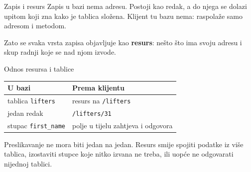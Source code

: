 \begin{frame}{Zapis i resurs}
Zapis u bazi nema adresu. Postoji kao redak, a do njega se dolazi upitom koji zna kako je tablica složena. Klijent tu bazu nema: raspolaže samo adresom i metodom.

\vspace{0.9em}
\begin{center}
\end{center}

\vspace{0.9em}
Zato se svaka vrsta zapisa objavljuje kao \textbf{resurs}: nešto što ima svoju adresu i skup radnji koje se nad njom izvode.
\end{frame}

\begin{frame}{Odnos resursa i tablice}
\vspace{0.4em}
\begin{center}
{\small
\setlength{\tabcolsep}{10pt}
\renewcommand{\arraystretch}{1.3}
\begin{tabular}{@{}ll@{}}
  \toprule
  \textbf{U bazi} & \textbf{Prema klijentu} \\
  \midrule
  tablica \texttt{lifters}    & resurs na \texttt{/lifters} \\
  jedan redak                 & \texttt{/lifters/31} \\
  stupac \texttt{first\_name} & polje u tijelu zahtjeva i odgovora \\
  \bottomrule
\end{tabular}
}
\end{center}

\vspace{1.1em}
Preslikavanje ne mora biti jedan na jedan. Resurs smije spojiti podatke iz više tablica, izostaviti stupce koje nitko izvana ne treba, ili uopće ne odgovarati nijednoj tablici.
\end{frame}

